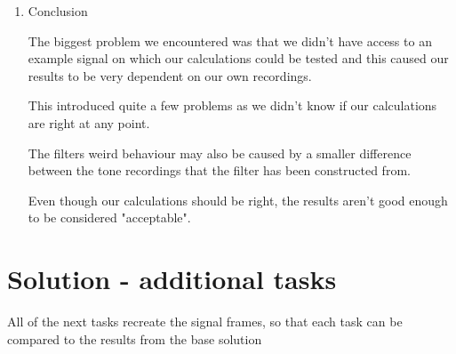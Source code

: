 \documentclass[a4paper, 11pt]{article}
\begin{document}
\begin{enumerate}
        \item
        Conclusion

        The biggest problem we encountered was that we didn't have access to an example signal
        on which our calculations could be tested and this caused our results to be very dependent
        on our own recordings.

        This introduced quite a few problems
        as we didn't know if our calculations are right at any point.

        The filters weird behaviour may also be caused by a smaller difference between the tone recordings
        that the filter has been constructed from.

        Even though our calculations should be right, the results aren't good enough to be considered "acceptable".

    \end{enumerate}

    \newpage
    \section*{Solution - additional tasks}

    All of the next tasks recreate the signal frames,
    so that each task can be compared to the results from the base solution
\end{document}
